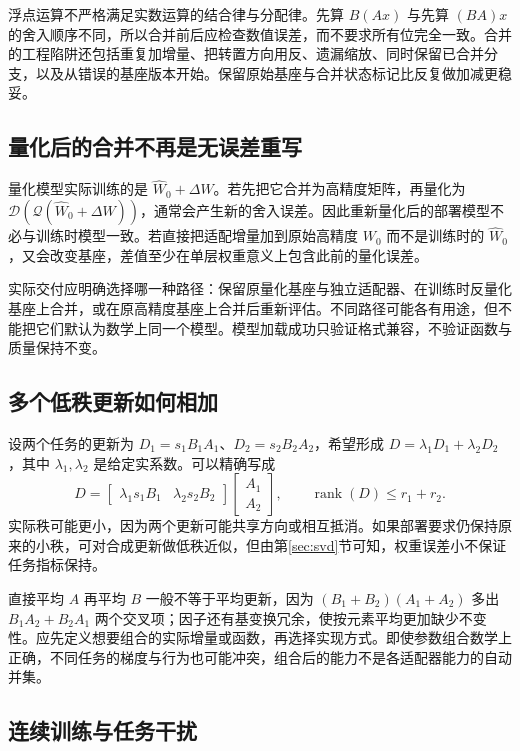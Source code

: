 \documentclass[UTF8,12pt,a4paper,fontset=fandol]{ctexart}
\begin{document}
浮点运算不严格满足实数运算的结合律与分配律。先算 $B(Ax)$ 与先算 $(BA)x$ 的舍入顺序不同，所以合并前后应检查数值误差，而不要求所有位完全一致。合并的工程陷阱还包括重复加增量、把转置方向用反、遗漏缩放、同时保留已合并分支，以及从错误的基座版本开始。保留原始基座与合并状态标记比反复做加减更稳妥。

\subsection{量化后的合并不再是无误差重写}

量化模型实际训练的是 $\widehat W_0+\Delta W$。若先把它合并为高精度矩阵，再量化为
$\mathcal D(\mathcal Q(\widehat W_0+\Delta W))$，通常会产生新的舍入误差。因此重新量化后的部署模型不必与训练时模型一致。若直接把适配增量加到原始高精度 $W_0$ 而不是训练时的 $\widehat W_0$，又会改变基座，差值至少在单层权重意义上包含此前的量化误差。

实际交付应明确选择哪一种路径：保留原量化基座与独立适配器、在训练时反量化基座上合并，或在原高精度基座上合并后重新评估。不同路径可能各有用途，但不能把它们默认为数学上同一个模型。模型加载成功只验证格式兼容，不验证函数与质量保持不变。

\subsection{多个低秩更新如何相加}

设两个任务的更新为 $D_1=s_1B_1A_1$、$D_2=s_2B_2A_2$，希望形成
$D=\lambda_1D_1+\lambda_2D_2$，其中 $\lambda_1,\lambda_2$ 是给定实系数。可以精确写成
\[
D=
\begin{bmatrix}\lambda_1s_1B_1&\lambda_2s_2B_2\end{bmatrix}
\begin{bmatrix}A_1\\A_2\end{bmatrix},
\qquad
\operatorname{rank}(D)\leq r_1+r_2.
\]
实际秩可能更小，因为两个更新可能共享方向或相互抵消。如果部署要求仍保持原来的小秩，可对合成更新做低秩近似，但由第\ref{sec:svd}节可知，权重误差小不保证任务指标保持。

直接平均 $A$ 再平均 $B$ 一般不等于平均更新，因为
$(B_1+B_2)(A_1+A_2)$ 多出 $B_1A_2+B_2A_1$ 两个交叉项；因子还有基变换冗余，使按元素平均更加缺少不变性。应先定义想要组合的实际增量或函数，再选择实现方式。即使参数组合数学上正确，不同任务的梯度与行为也可能冲突，组合后的能力不是各适配器能力的自动并集。

\subsection{连续训练与任务干扰}
\end{document}
